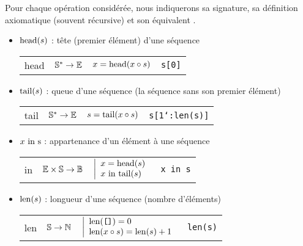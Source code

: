 Pour chaque opération considérée, nous indiquerons sa signature, sa définition axiomatique 
(souvent récursive) et son équivalent {\color{blue}\python}.
\begin{itemize}
\item ${\rm head}(s)$ : tête (premier élément) d'une séquence\\
{\begin{tabular}{p{1cm}@{ : }p{2cm}@{ , }p{6.75cm}p{4.5cm}}
head & $\Bbb S^* \rightarrow \Bbb E$ 	& $x = {\rm head}(x \circ s)$				& \color{blue}\tt s[0]
\end{tabular}}

\item ${\rm tail}(s)$ : queue d'une séquence (la séquence sans son premier élément)\\
{\begin{tabular}{p{1cm}@{ : }p{2cm}@{ , }p{6.75cm}p{4.5cm}}
tail & $\Bbb S^* \rightarrow \Bbb E$	& $s = {\rm tail}(x \circ s)$				& \color{blue}\tt s[1\char`:len(s)]
\end{tabular}}

\item $x \mbox{\rm\ in\ s}$ : appartenance d'un élément à une séquence\\
{\begin{tabular}{p{1cm}@{ : }p{2cm}@{ , }p{6.75cm}p{4.5cm}}
in & $\Bbb E \times \Bbb S \rightarrow \Bbb B$	 & $\displaystyle\left|\begin{array}{l}x = {\rm head}(s)\\ 
                                                                                              x \mbox{\rm\ in\ } {\rm tail}(s)\end{array}\right.$ & \color{blue}\tt x in s
\end{tabular}}

\item ${\rm len}(s)$ : longueur d'une séquence (nombre d'éléments)\\
{\begin{tabular}{p{1cm}@{ : }p{2cm}@{ , }p{6.75cm}p{4.5cm}}
len & $\Bbb S \rightarrow \Bbb N$	& $\displaystyle\left|\begin{array}{l}{\rm len}(\mbox{\tt []}) = 0\\ 
                                                                                              {\rm len}(x \circ s) = {\rm len}(s) + 1\end{array}\right.$ & \color{blue}\tt len(s)
\end{tabular}}


\end{itemize}
